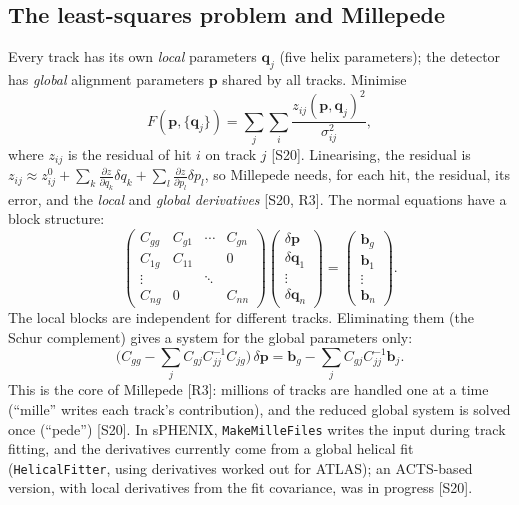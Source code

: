 \documentclass[11pt,letterpaper]{article}
\begin{document}
\subsection{The least-squares problem and Millepede}
Every track has its own \emph{local} parameters $\mathbf{q}_j$ (five helix parameters); the detector has \emph{global} alignment parameters $\mathbf{p}$ shared by all tracks.
Minimise
\begin{equation}
F(\mathbf{p},\{\mathbf{q}_j\}) = \sum_j\sum_i \frac{z_{ij}(\mathbf{p},\mathbf{q}_j)^2}{\sigma_{ij}^2},
\end{equation}
where $z_{ij}$ is the residual of hit $i$ on track $j$ [S20]. Linearising, the residual is $z_{ij}\approx z^0_{ij}+\sum_k\frac{\partial z}{\partial q_k}\delta q_k+\sum_l\frac{\partial z}{\partial p_l}\delta p_l$,
so Millepede needs, for each hit, the residual, its error, and the \emph{local} and \emph{global derivatives} [S20, R3].
The normal equations have a block structure:
\begin{equation}
\begin{pmatrix} C_{gg} & C_{g1} & \cdots & C_{gn}\\ C_{1g} & C_{11} & & 0\\ \vdots & & \ddots & \\ C_{ng} & 0 & & C_{nn}\end{pmatrix}
\begin{pmatrix}\delta\mathbf{p}\\ \delta\mathbf{q}_1\\ \vdots\\ \delta\mathbf{q}_n\end{pmatrix} = \begin{pmatrix}\mathbf{b}_g\\ \mathbf{b}_1\\ \vdots\\ \mathbf{b}_n\end{pmatrix}.
\end{equation}
The local blocks are independent for different tracks. Eliminating them (the Schur complement) gives a system for the global parameters only:
\begin{equation}
\Big(C_{gg}-\sum_j C_{gj}C_{jj}^{-1}C_{jg}\Big)\,\delta\mathbf{p} = \mathbf{b}_g-\sum_j C_{gj}C_{jj}^{-1}\mathbf{b}_j .
\end{equation}
This is the core of Millepede [R3]: millions of tracks are handled one at a time (``mille'' writes each track's contribution), and the reduced global system is solved once (``pede'') [S20].
In sPHENIX, \texttt{MakeMilleFiles} writes the input during track fitting, and the derivatives currently come from a global helical fit (\texttt{HelicalFitter}, using derivatives worked out for ATLAS); an ACTS-based version, with local derivatives from the fit covariance, was in progress [S20].
\end{document}
